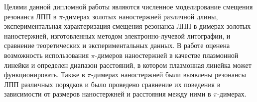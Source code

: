 Целями данной дипломной работы являются численное моделирование смещения резонанса ЛПП в $ \pi $-димерах золотых наностержней различной длины, экспериментальная характеризация смещения резонанса ЛПП в димерах золотых наностержней, изготовленных методом электронно-лучевой литографии, и сравнение теоретических и экспериментальных данных. В работе оценена возможность использования $ \pi $-димеров наностержней в качестве плазмонной линейки и определен диапазон расстояний, в котором плазмонная линейка может функционировать. Также в $ \pi $-димерах наностержней были выявлены резонансы ЛПП различных порядков и было проведено сравнение их поведения в зависимости от размеров наностержней и расстояния между ними в $ \pi $-димерах.